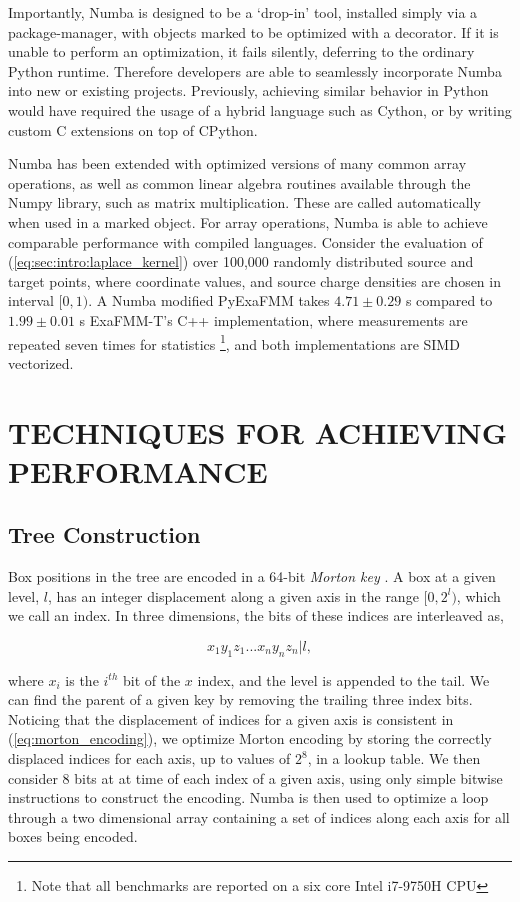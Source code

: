 \documentclass{IEEEcsmag}
\begin{document}
Importantly, Numba is designed to be a `drop-in' tool, installed simply via a package-manager, with objects marked to be optimized with a decorator. If it is unable to perform an optimization, it fails silently, deferring to the ordinary Python runtime. Therefore developers are able to seamlessly incorporate Numba into new or existing projects. Previously, achieving similar behavior in Python would have required the usage of a hybrid language such as Cython, or by writing custom C extensions on top of CPython.

Numba has been extended with optimized versions of many common array operations, as well as common linear algebra routines available through the Numpy library, such as matrix multiplication. These are called automatically when used in a marked object. For array operations, Numba is able to achieve comparable performance with compiled languages. Consider the evaluation of (\ref{eq:sec:intro:laplace_kernel}) over 100,000 randomly distributed source and target points, where coordinate values, and source charge densities are chosen in interval $[0, 1)$. A Numba modified PyExaFMM takes $4.71 \pm 0.29$ s compared to $1.99 \pm 0.01$ s ExaFMM-T's C++ implementation, where measurements are repeated seven times for statistics \footnote[2]{Note that all benchmarks are reported on a six core Intel i7-9750H CPU}, and both implementations are SIMD vectorized.

\section{TECHNIQUES FOR ACHIEVING PERFORMANCE}

\subsection{Tree Construction}

Box positions in the tree are encoded in a 64-bit \textit{Morton key} \cite{Sundar2007}. A box at a given level, $l$, has an integer displacement along a given axis in the range $[0, 2^l)$, which we call an index. In three dimensions, the bits of these indices are interleaved as,

\begin{equation}
	\label{eq:morton_encoding}
	x_1y_1z_1...x_ny_nz_n | l,
\end{equation}

where $x_i$ is the $i^{th}$ bit of the $x$ index, and the level is appended to the tail. We can find the parent of a given key by removing the trailing three index bits. Noticing that the displacement of indices for a given axis is consistent in (\ref{eq:morton_encoding}), we optimize Morton encoding by storing the correctly displaced indices for each axis, up to values of $2^8$, in a lookup table. We then consider 8 bits at at time of each index of a given axis, using only simple bitwise instructions to construct the encoding. Numba is then used to optimize a loop through a two dimensional array containing a set of indices along each axis for all boxes being encoded.
\end{document}

